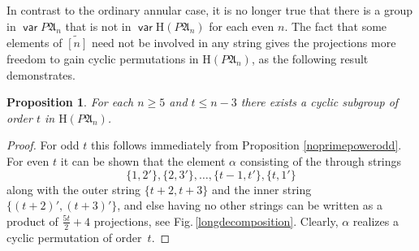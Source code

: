 \documentclass[preprint,1p,times]{elsarticle}
\DeclareMathOperator{\var}{\mathsf{var}}
\numberwithin{equation}{section}
\newtheorem{Prop}[Thm]{Proposition}
\theoremstyle{remark}
\def\al{\alpha}
\def\H{\mathrm H}
\def\A{\mathfrak{A}}
\def\wt{\widetilde}
\begin{document}

In contrast to the ordinary annular case, it is no longer true that there is a group in $\var P\A_n$ that is not in
$\var\H(P\A_n)$ for each even $n$. The fact that some elements of $\wt{[n]}$ need not be involved in any string gives
the projections more freedom to gain cyclic permutations in $\H(P\A_n)$, as the following result demonstrates.

\begin{Prop}
\label{partialannular} For each $n\ge 5$ and $t\le n-3$ there exists a cyclic subgroup of order $t$ in $\H(P\A_n)$.
\end{Prop}

\begin{proof}
For odd $t$ this follows immediately from Proposition \ref{noprimepowerodd}. For even $t$ it can be shown that the
element $\al$ consisting of the through strings
$$\{1,2'\}, \{2,3'\},\dots,\{t-1,t'\},\{t,1'\}$$
along with the outer string $\{t{+}2,t{+}3\}$ and the inner string $\{(t{+}2)',(t{+}3)'\}$, and else having no other
strings can be written as a product of $\frac{5t}2 + 4$ projections, see Fig.\,\ref{longdecomposition}. Clearly, $\al$
realizes a cyclic permutation of order~$t$.
\end{proof}
\end{document}
